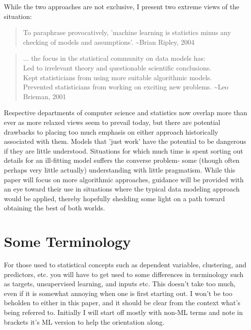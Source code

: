 \documentclass[english,nohyper,titlepage]{tufte-handout}
\begin{document}
While the two approaches are not exclusive, I present two extreme views of the situation:

\begin{quote}
To paraphrase provocatively, 'machine learning is statistics minus any checking of models and assumptions'.
\textasciitilde Brian Ripley, 2004
\end{quote}
\begin{quote}
... the focus in the statistical community on data models has:\\
Led to irrelevant theory and questionable scientific conclusions.\\
Kept statisticians from using more suitable algorithmic models.\\
Prevented statisticians from working on exciting new problems.
\textasciitilde Leo Brieman, 2001
\end{quote}


Respective departments of computer science and statistics now overlap more than ever as more relaxed views seem to prevail today, but there are potential drawbacks to placing too much emphasis on either approach historically associated with them.  Models that 'just work' have the potential to be dangerous if they are little understood.  Situations for which much time is spent sorting out details for an ill-fitting model suffers the converse problem- some (though often perhaps very little actually) understanding with little pragmatism.  While this paper will focus on more algorithmic approaches, guidance will be provided with an eye toward their use in situations where the typical data modeling approach would be applied, thereby hopefully shedding some light on a path toward obtaining the best of both worlds.

\section{Some Terminology}
For those used to statistical concepts such as dependent variables, clustering, and predictors, etc. you will have to get used to some differences in terminology such as targets, unsupervised learning, and inputs etc.  This doesn't take too much, even if it is somewhat annoying when one is first starting out.  I won't be too beholden to either in this paper, and it should be clear from the context what's being referred to.  Initially I will start off mostly with non-ML terms and note in brackets it's ML version to help the orientation along.
\end{document}
